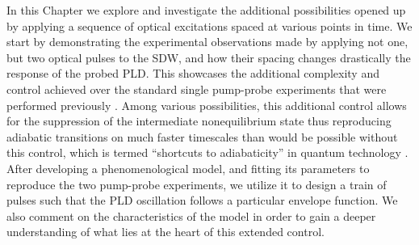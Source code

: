 In this Chapter we explore and investigate the additional possibilities opened up by applying a sequence of optical excitations spaced at various points in time.
We start by demonstrating the experimental observations made by applying not one, but two optical pulses to the SDW, and how their spacing changes drastically the response of the probed PLD.
This showcases the additional complexity and control achieved over the standard single pump-probe experiments that were performed previously \cite{Singer2015prb, Singer2015prb}. 
Among various possibilities, this additional control allows for the suppression of the intermediate nonequilibrium state thus reproducing adiabatic transitions on much faster timescales than would be possible without this control, which is termed ``shortcuts to adiabaticity'' in quantum technology \cite{Torrontegui2013,Deffner2014,Zhou2017}.
After developing a phenomenological model, and fitting its parameters to reproduce the two pump-probe experiments, we utilize it to design a train of pulses such that the PLD oscillation follows a particular envelope function.
We also comment on the characteristics of the model in order to gain a deeper understanding of what lies at the heart of this extended control. 

